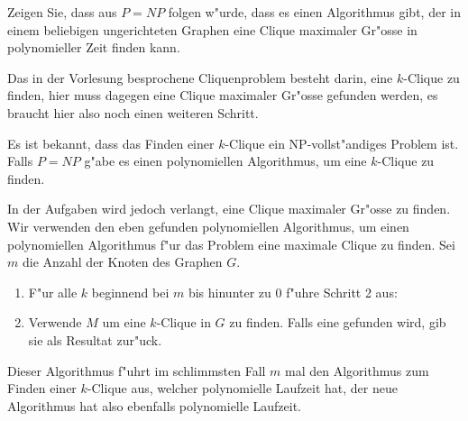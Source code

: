 Zeigen Sie, dass aus $P=NP$ folgen w"urde, dass es einen Algorithmus
gibt, der in einem beliebigen ungerichteten Graphen eine Clique
maximaler Gr"osse in polynomieller Zeit finden kann.

\begin{hinweis}
Das in der Vorlesung besprochene Cliquenproblem besteht
darin, eine $k$-Clique zu finden, hier muss dagegen eine Clique maximaler
Gr"osse gefunden werden, es braucht hier also noch einen weiteren
Schritt.
\end{hinweis}

\begin{loesung}
Es ist bekannt, dass das Finden einer $k$-Clique ein NP-vollst"andiges
Problem ist. Falls $P=NP$ g"abe es einen polynomiellen Algorithmus, um
eine $k$-Clique zu finden.

In der Aufgaben wird jedoch verlangt, eine Clique maximaler
Gr"osse zu finden. Wir verwenden den eben gefunden polynomiellen Algorithmus,
um einen polynomiellen Algorithmus f"ur das Problem eine maximale Clique
zu finden.
Sei $m$ die Anzahl der Knoten des Graphen $G$.
\begin{enumerate}
\item F"ur alle $k$ beginnend bei $m$ bis hinunter zu $0$ f"uhre Schritt 2 aus:
\item Verwende $M$ um eine $k$-Clique in $G$ zu finden. Falls eine
gefunden wird, gib sie als Resultat zur"uck.
\end{enumerate}
Dieser Algorithmus f"uhrt im schlimmsten Fall $m$ mal den Algorithmus zum
Finden einer $k$-Clique aus, welcher polynomielle Laufzeit hat, der neue
Algorithmus hat also ebenfalls polynomielle Laufzeit.
\end{loesung}

